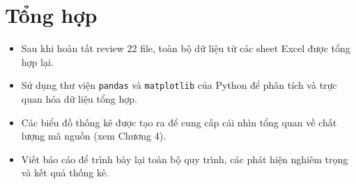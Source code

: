 \section{Tổng hợp}
\begin{itemize}
    \item Sau khi hoàn tất review 22 file, toàn bộ dữ liệu từ các sheet Excel được tổng hợp lại.
    \item Sử dụng thư viện \texttt{pandas} và \texttt{matplotlib} của Python để phân tích và trực quan hóa dữ liệu tổng hợp.
    \item Các biểu đồ thống kê được tạo ra để cung cấp cái nhìn tổng quan về chất lượng mã nguồn (xem Chương 4).
    \item Viết báo cáo để trình bày lại toàn bộ quy trình, các phát hiện nghiêm trọng và kết quả thống kê.
\end{itemize}

\newpage